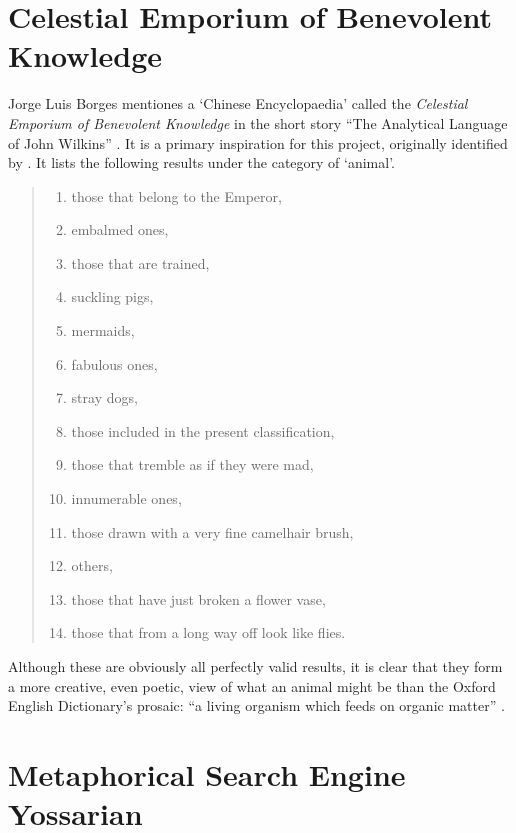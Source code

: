 

\section{Celestial Emporium of Benevolent Knowledge}

Jorge Luis Borges mentiones a `Chinese Encyclopaedia' called the \textit{Celestial Emporium of Benevolent Knowledge} in the short story ``The Analytical Language of John Wilkins'' \autocite{Borges2000}. It is a primary inspiration for this project, originally identified by \autocite{Hendler2011, Hendler2013}. It lists the following results under the category of `animal'.

\begin{quote}
\begin{enumerate}
  \item those that belong to the Emperor,
  \item embalmed ones,
  \item those that are trained,
  \item suckling pigs,
  \item mermaids,
  \item fabulous ones,
  \item stray dogs,
  \item those included in the present classification,
  \item those that tremble as if they were mad,
  \item innumerable ones,
  \item those drawn with a very fine camelhair brush,
  \item others,
  \item those that have just broken a flower vase,
  \item those that from a long way off look like flies.
\end{enumerate}
\end{quote}

Although these are obviously all perfectly valid results, it is clear that they form a more creative, even poetic, view of what an animal might be than the Oxford English Dictionary's prosaic: ``a living organism which feeds on organic matter'' \autocite{OEDanimal}.



\section{Metaphorical Search Engine Yossarian}

